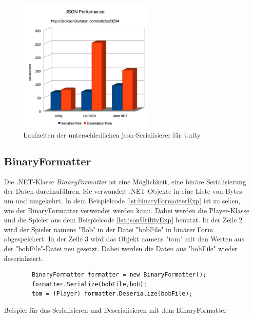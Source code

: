 \begin{figure}[htp]
    \centering
    \includegraphics[width=0.6\textwidth]{images/UnityJsonPerformance.png}
    \caption{Laufzeiten der unterschiedlichen \ac{json}-Serialisierer für Unity \cite{jacksondunstanJacksonDunstancomJSON}}
    \label{fig:unityJsonPerformance}
\end{figure}



\subsection{BinaryFormatter}\label{ssec:binaryFormatter}
Die .NET-Klasse \textit{BinaryFormatter} ist eine Möglichkeit, eine binäre Serialisierung der Daten durchzuführen. Sie verwandelt .NET-Objekte in eine Liste von Bytes um und umgekehrt. In dem Beispielcode \ref{lst:binaryFormatterExp} ist zu sehen, wie der BinaryFormatter verwendet werden kann. Dabei werden die Player-Klasse und die Spieler aus dem Beispielcode \ref{lst:jsonUtilityExp} benutzt. In der Zeile 2 wird der Spieler namens "Bob" in der Datei "bobFile" in binärer Form abgespeichert. In der Zeile 3 wird das Objekt namens "tom" mit den Werten aus der "bobFile"-Datei neu gesetzt. Dabei werden die Daten aus "bobFile" wieder deserialisiert.\cite{microsoftBinaryFormatterClass} 

\begin{listing}[htp]
    \begin{verbatim} 
        BinaryFormatter formatter = new BinaryFormatter();
        formatter.Serialize(bobFile,bob);
        tom = (Player) formatter.Deserialize(bobFile);
    \end{verbatim}
    \caption{Beispiel für das Serialisieren und Deserialisieren mit dem BinaryFormatter}
    \label{lst:binaryFormatterExp}
\end{listing}

